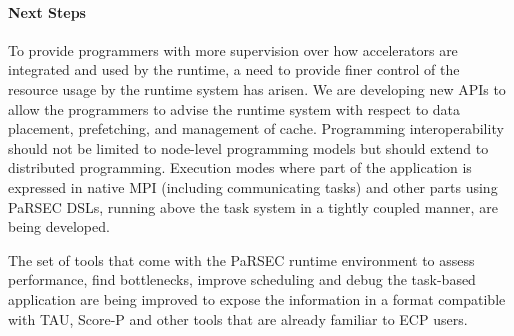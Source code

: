 \paragraph{Next Steps}
To provide programmers with more supervision over how accelerators are
integrated and used by the runtime, a need to provide finer control of the
resource usage by the runtime system has arisen. We are developing new APIs to
allow the programmers to advise the runtime system with respect to data
placement, prefetching, and management of cache.
%
Programming interoperability should not be limited to node-level programming
models but should extend to distributed programming. Execution modes where part
of the application is expressed in native MPI (including communicating tasks)
and other parts using PaRSEC DSLs, running above the task system in a tightly
coupled manner, are being developed.


The set of tools that come with the PaRSEC runtime environment to
assess performance, find bottlenecks, improve scheduling and debug the
task-based application are being improved to expose the information
in a format compatible with TAU, Score-P and other
tools that are already familiar to ECP users.
